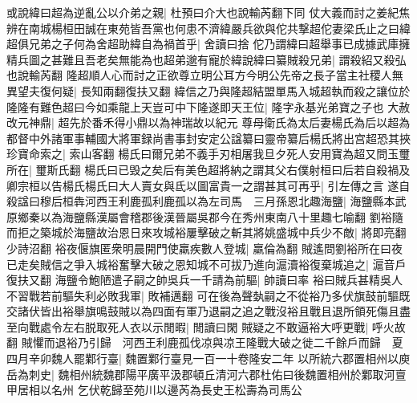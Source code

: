 或說緯曰超為逆亂公以介弟之親|{
	杜預曰介大也說輸芮翻下同}
仗大義而討之姜紀焦辨在南城楊桓田誠在東苑皆吾黨也何患不濟緯嚴兵欲與佗共撃超佗妻梁氏止之曰緯超俱兄弟之子何為舍超助緯自為禍首乎|{
	舍讀曰捨}
佗乃謂緯曰超舉事已成據武庫擁精兵圖之甚難且吾老矣無能為也超弟邈有寵於緯說緯曰纂賊殺兄弟|{
	謂殺紹又殺弘也說輸芮翻}
隆超順人心而討之正欲尊立明公耳方今明公先帝之長子當主社稷人無異望夫復何疑|{
	長知兩翻復扶又翻}
緯信之乃與隆超結盟單馬入城超執而殺之讓位於隆隆有難色超曰今如乘龍上天豈可中下隆遂即天王位|{
	隆字永基光弟寶之子也}
大赦改元神鼎|{
	超先於番禾得小鼎以為神瑞故以紀元}
尊母衛氏為太后妻楊氏為后以超為都督中外諸軍事輔國大將軍録尚書事封安定公諡纂曰靈帝纂后楊氏將出宫超恐其挾珍寶命索之|{
	索山客翻}
楊氏曰爾兄弟不義手刃相屠我旦夕死人安用寶為超又問玉璽所在|{
	璽斯氏翻}
楊氏曰已毁之矣后有美色超將納之謂其父右僕射桓曰后若自殺禍及卿宗桓以告楊氏楊氏曰大人賣女與氐以圖富貴一之謂甚其可再乎|{
	引左傳之言}
遂自殺諡曰穆后桓犇河西王利鹿孤利鹿孤以為左司馬　三月孫恩北趣海鹽|{
	海鹽縣本武原鄉秦以為海鹽縣漢屬會稽郡後漢晉屬吳郡今在秀州東南八十里趣七喻翻}
劉裕隨而拒之築城於海鹽故治恩日來攻城裕屢擊破之斬其將姚盛城中兵少不敵|{
	將即亮翻少詩沼翻}
裕夜偃旗匿衆明晨開門使羸疾數人登城|{
	羸倫為翻}
賊遙問劉裕所在曰夜已走矣賊信之爭入城裕奮擊大破之恩知城不可拔乃進向滬瀆裕復棄城追之|{
	滬音戶復扶又翻}
海鹽令鮑陋遣子嗣之帥吳兵一千請為前驅|{
	帥讀曰率}
裕曰賊兵甚精吳人不習戰若前驅失利必敗我軍|{
	敗補邁翻}
可在後為聲埶嗣之不從裕乃多伏旗鼓前驅既交諸伏皆出裕舉旗鳴鼓賊以為四面有軍乃退嗣之追之戰沒裕且戰且退所領死傷且盡至向戰處令左右脱取死人衣以示閒暇|{
	閒讀曰閑}
賊疑之不敢逼裕大呼更戰|{
	呼火故翻}
賊懼而退裕乃引歸　河西王利鹿孤伐凉與凉王隆戰大破之徙二千餘戶而歸　夏四月辛卯魏人罷鄴行臺|{
	魏置鄴行臺見一百一十卷隆安二年}
以所統六郡置相州以庾岳為刺史|{
	魏相州統魏郡陽平廣平汲郡頓丘清河六郡杜佑曰後魏置相州於鄴取河亶甲居相以名州}
乞伏乾歸至苑川以邊芮為長史王松壽為司馬公

